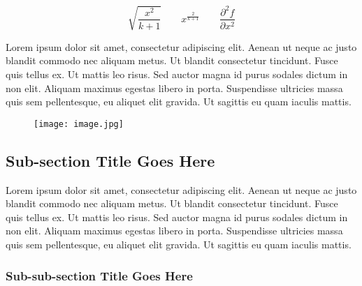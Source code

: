 \documentclass{csmagazine}
\begin{document}
\begin{flushleft}

\begin{equation}
\sqrt{\frac{x^2}{k+1}}\qquad
x^\frac{2}{k+1}\qquad
\frac{\partial^2f}{\partial x^2}
\end{equation}

Lorem ipsum dolor sit amet, consectetur adipiscing elit. Aenean ut neque ac justo blandit commodo nec aliquam metus. Ut blandit consectetur tincidunt. Fusce quis tellus ex. Ut mattis leo risus. Sed auctor magna id purus sodales dictum in non elit. Aliquam maximus egestas libero in porta. Suspendisse ultricies massa quis sem pellentesque, eu aliquet elit gravida. Ut sagittis eu quam iaculis mattis.


\begin{figure}[h!]
	\begin{center}	
	\texttt{[image: image.jpg]}
	\end{center}
\end{figure}

\subsection*{Sub-section Title Goes Here}

Lorem ipsum dolor sit amet, consectetur adipiscing elit. Aenean ut neque ac justo blandit commodo nec aliquam metus. Ut blandit consectetur tincidunt. Fusce quis tellus ex. Ut mattis leo risus. Sed auctor magna id purus sodales dictum in non elit. Aliquam maximus egestas libero in porta. Suspendisse ultricies massa quis sem pellentesque, eu aliquet elit gravida. Ut sagittis eu quam iaculis mattis.

\subsubsection*{Sub-sub-section Title Goes Here}


\end{flushleft}
\end{document}
